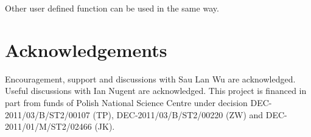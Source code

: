 \documentclass[12pt]{article}
\begin{document}
Other user defined function can be used in the same way.


\section*{Acknowledgements}
Encouragement, support and discussions with Sau Lan Wu are acknowledged.
Useful discussions with Ian Nugent are acknowledged.
This project is financed in part from funds of Polish National Science
Centre under decision DEC-2011/03/B/ST2/00107 (TP), DEC-2011/03/B/ST2/00220 
(ZW) and DEC-2011/01/M/ST2/02466 (JK). 

{}

\end{document}
